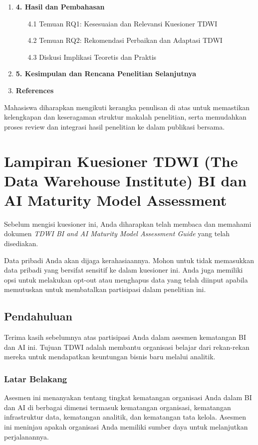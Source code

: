 \documentclass{article}
\begin{document}
\begin{enumerate}
	\item \textbf{4. Hasil dan Pembahasan}
	\begin{enumerate}
		\item[4.1] Temuan RQ1: Kesesuaian dan Relevansi Kuesioner TDWI
		\item[4.2] Temuan RQ2: Rekomendasi Perbaikan dan Adaptasi TDWI
		\item[4.3] Diskusi Implikasi Teoretis dan Praktis
	\end{enumerate}
	
	\item \textbf{5. Kesimpulan dan Rencana Penelitian Selanjutnya}
	
	\item \textbf{References}
\end{enumerate}

Mahasiswa diharapkan mengikuti kerangka penulisan di atas untuk memastikan kelengkapan dan keseragaman struktur makalah penelitian, serta memudahkan proses review dan integrasi hasil penelitian ke dalam publikasi bersama.


\newpage


\appendix

\section{Lampiran Kuesioner TDWI (The Data Warehouse Institute) BI dan AI Maturity Model Assessment}

Sebelum mengisi kuesioner ini, Anda diharapkan telah membaca dan memahami dokumen \textit{TDWI BI and AI Maturity Model Assessment Guide} yang telah disediakan.

Data pribadi Anda akan dijaga kerahasiaannya. Mohon untuk tidak memasukkan data pribadi yang bersifat sensitif ke dalam kuesioner ini. Anda juga memiliki opsi untuk melakukan opt-out atau menghapus data yang telah diinput apabila memutuskan untuk membatalkan partisipasi dalam penelitian ini.


\subsection{Pendahuluan}
Terima kasih sebelumnya atas partisipasi Anda dalam asesmen kematangan BI dan AI ini. Tujuan TDWI adalah membantu organisasi belajar dari rekan-rekan mereka untuk mendapatkan keuntungan bisnis baru melalui analitik.

\subsubsection{Latar Belakang}
Asesmen ini menanyakan tentang tingkat kematangan organisasi Anda dalam BI dan AI di berbagai dimensi termasuk kematangan organisasi, kematangan infrastruktur data, kematangan analitik, dan kematangan tata kelola. Asesmen ini meninjau apakah organisasi Anda memiliki sumber daya untuk melanjutkan perjalanannya.
\end{document}
